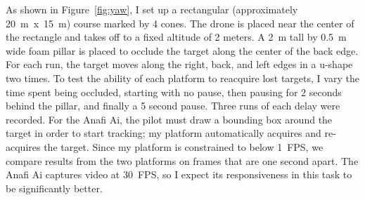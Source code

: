 As shown in Figure~\ref{fig:yaw}, I set up a rectangular
(approximately 20~m~x~15~m) course marked by 4 cones.  The drone is
placed near the center of the rectangle and takes off to a fixed
altitude of 2 meters. A 2~m tall by 0.5~m wide foam pillar is placed
to occlude the target along the center of the back edge. For each run,
the target moves along the right, back, and left edges in a u-shape
two times. To test the ability of each platform to reacquire lost
targets, I vary the time spent being occluded, starting with no
pause, then pausing for 2 seconds behind the pillar, and finally a 5
second pause. Three runs of each delay were recorded.  For the Anafi
Ai, the pilot must draw a bounding box around the target in order to
start tracking; my platform automatically acquires and re-acquires
the target.  Since my platform is constrained to below 1~FPS, we
compare results from the two platforms on frames that are one second
apart.  The Anafi Ai captures video at 30~FPS, so I expect its
responsiveness in this task to be significantly better.

